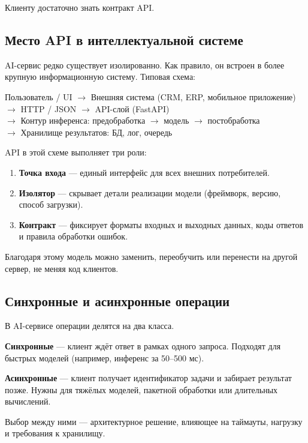 \documentclass[12pt,a4paper]{article}
\begin{document}
Клиенту достаточно знать контракт API.

\subsection{Место API в интеллектуальной системе}

AI-сервис редко существует изолированно. Как правило, он встроен в более крупную информационную систему. Типовая схема:

\begin{center}
Пользователь / UI $\rightarrow$ Внешняя система (CRM, ERP, мобильное приложение) \\
$\rightarrow$ HTTP / JSON $\rightarrow$ API-слой (FastAPI) \\
$\rightarrow$ Контур инференса: предобработка $\rightarrow$ модель $\rightarrow$ постобработка \\
$\rightarrow$ Хранилище результатов: БД, лог, очередь
\end{center}

API в этой схеме выполняет три роли:

\begin{enumerate}
    \item \textbf{Точка входа} — единый интерфейс для всех внешних потребителей.
    \item \textbf{Изолятор} — скрывает детали реализации модели (фреймворк, версию, способ загрузки).
    \item \textbf{Контракт} — фиксирует форматы входных и выходных данных, коды ответов и правила обработки ошибок.
\end{enumerate}

Благодаря этому модель можно заменить, переобучить или перенести на другой сервер, не меняя код клиентов.

\subsection{Синхронные и асинхронные операции}

В AI-сервисе операции делятся на два класса.

\textbf{Синхронные} — клиент ждёт ответ в рамках одного запроса. Подходят для быстрых моделей (например, инференс за 50--500 мс).

\textbf{Асинхронные} — клиент получает идентификатор задачи и забирает результат позже. Нужны для тяжёлых моделей, пакетной обработки или длительных вычислений.

Выбор между ними — архитектурное решение, влияющее на таймауты, нагрузку и требования к хранилищу.
\end{document}
